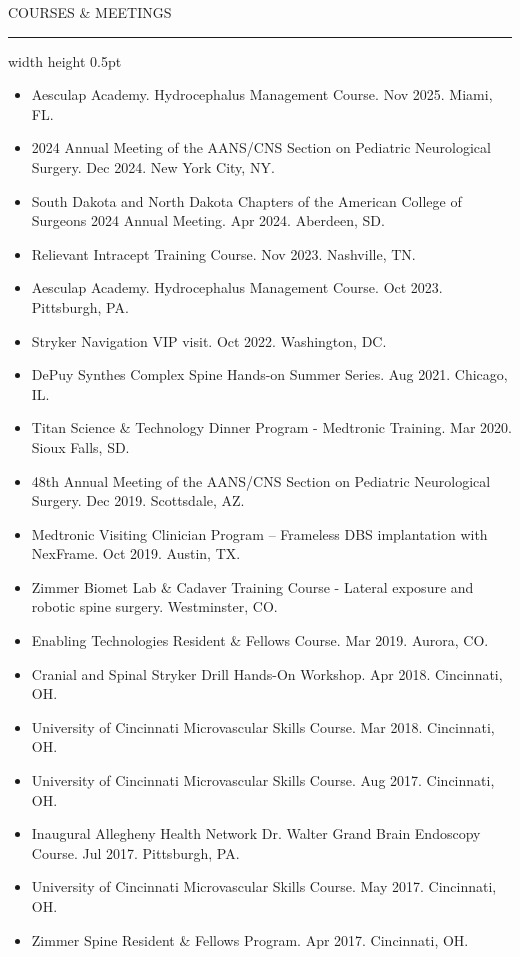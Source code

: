 \documentclass[11pt, a4paper]{article}
\newcommand{\cvsection}[1]{%
  \par\vspace{1.5ex}%
  {\Large\color{primary}\scshape\MakeUppercase{#1}}%
  \nopagebreak[4]%
  \vspace{0.3em}%
  \nopagebreak[4]%
  \hrule width \linewidth height 0.5pt \color{primary}%
  \vspace{0.5ex}%
}
\begin{document}
\cvsection{Courses \& Meetings}
\begin{itemize}
  \setlength\itemindent{0.25em}
  \item Aesculap Academy. Hydrocephalus Management Course. Nov 2025. Miami, FL.
  \item 2024 Annual Meeting of the AANS/CNS Section on Pediatric Neurological Surgery. Dec 2024. New York City, NY.
  \item South Dakota and North Dakota Chapters of the American College of Surgeons 2024 Annual Meeting. Apr 2024. Aberdeen, SD.
  \item Relievant Intracept Training Course. Nov 2023. Nashville, TN.
  \item Aesculap Academy. Hydrocephalus Management Course. Oct 2023. Pittsburgh, PA.
  \item Stryker Navigation VIP visit. Oct 2022. Washington, DC.
  \item DePuy Synthes Complex Spine Hands-on Summer Series. Aug 2021. Chicago, IL.
  \item Titan Science \& Technology Dinner Program - Medtronic Training. Mar 2020. Sioux Falls, SD.
  \item 48th Annual Meeting of the AANS/CNS Section on Pediatric Neurological Surgery. Dec 2019. Scottsdale, AZ.
  \item Medtronic Visiting Clinician Program -- Frameless DBS implantation with NexFrame. Oct 2019. Austin, TX.
  \item Zimmer Biomet Lab \& Cadaver Training Course - Lateral exposure and robotic spine surgery. Westminster, CO.
  \item Enabling Technologies Resident \& Fellows Course. Mar 2019. Aurora, CO.
  \item Cranial and Spinal Stryker Drill Hands-On Workshop. Apr 2018. Cincinnati, OH.
  \item University of Cincinnati Microvascular Skills Course. Mar 2018. Cincinnati, OH.
  \item University of Cincinnati Microvascular Skills Course. Aug 2017. Cincinnati, OH.
  \item Inaugural Allegheny Health Network Dr. Walter Grand Brain Endoscopy Course. Jul 2017. Pittsburgh, PA.
  \item University of Cincinnati Microvascular Skills Course. May 2017. Cincinnati, OH.
  \item Zimmer Spine Resident \& Fellows Program. Apr 2017. Cincinnati, OH.

\end{itemize}
\end{document}
